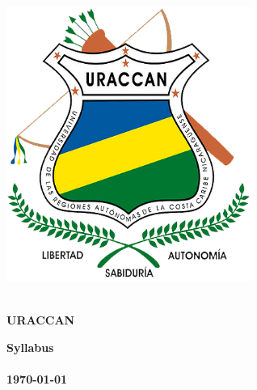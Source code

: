 
\begin{titlepage}
    \centering %
    \begin{minipage}{0.25\textwidth} %
        \centering %
        \includegraphics[width=0.6\textwidth]{images/uraccan_logo.png} %
    \end{minipage}%
    \begin{minipage}{0.75\textwidth} %
        \centering %
        \Large{\textbf{\universidad}}\\ %
        \Large{\textbf{URACCAN}}\\ %
    \end{minipage}

    \vfill %
    \large{\textbf{Syllabus}}\\
    \Huge{\textbf{\asignatura}}\\ %

    \vfill %
    \small{\textbf{\today{}}}\\ %
\end{titlepage}